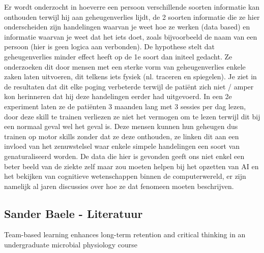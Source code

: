 \documentclass{hogent-article}
\begin{document}
	Er wordt onderzocht in hoeverre een persoon verschillende soorten informatie kan onthouden terwijl hij aan geheugenverlies lijdt, de 2 soorten informatie die ze hier onderscheiden zijn
	handelingen waarvan je weet hoe ze werken (data based) en informatie waarvan je weet dat het iets doet, zoals bijvoorbeeld de naam van een persoon (hier is geen logica aan verbonden).
	De hypothese stelt dat geheugenverlies minder effect heeft op de 1e soort dan initeel gedacht. Ze onderzoeken dit door mensen met een sterke vorm van geheugenverlies enkele zaken laten
	uitvoeren, dit telkens iets fysiek (nl. traceren en spiegelen). Je ziet in de resultaten dat dit elke poging verbeterde terwijl de patiënt zich niet / amper kon herinneren dat hij deze 
	handelingen eerder had uitgevoerd. In een 2e experiment laten ze de patiënten 3 maanden lang met 3 sessies per dag lezen, door deze skill te trainen verliezen ze niet het vermogen om te
	lezen terwijl dit bij een normaal geval wel het geval is. Deze mensen kunnen hun geheugen dus trainen op motor skills zonder dat ze deze onthouden, ze linken dit aan een invloed van het
	zenuwstelsel waar enkele simpele handelingen een soort van genaturaliseerd worden. De data die hier is gevonden geeft ons niet enkel een beter beeld van de ziekte zelf maar zou moeten
	helpen bij het opzetten van AI en het bekijken van cognitieve wetenschappen binnen de computerwereld, er zijn namelijk al jaren discussies over hoe ze dat fenomeen moeten beschrijven.
	
	\subsection{Sander Baele - Literatuur}
	Team-based learning enhances long-term retention and critical thinking in an undergraduate microbial physiology course \autocite{Mcinerney2003}
	
\end{document}
